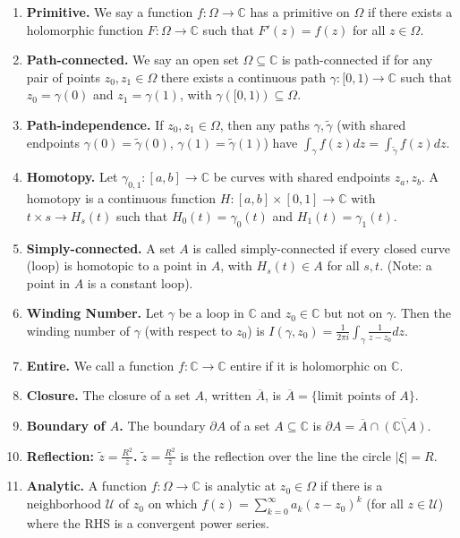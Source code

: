 \documentclass[11pt]{article}
\theoremstyle{definition}
\theoremstyle{named}
\begin{document}
\begin{enumerate}
    \item \textbf{Primitive. } We say a function $f: \Omega \to \mathbb{C}$ has a primitive on $\Omega$ if there exists a holomorphic function $F: \Omega \to \mathbb{C}$ such that $F'(z) = f(z)$ for all $z \in \Omega$. 
    \item \textbf{Path-connected. } We say an open set $\Omega \subseteq \mathbb{C}$ is path-connected if for any pair of points $z_0, z_1 \in \Omega$ there exists a continuous path $\gamma: [0,1) \to \mathbb{C}$ such that $z_0 = \gamma(0)$ and $z_1 = \gamma(1)$, with $\gamma\left([0,1)\right) \subseteq \Omega$. 
    \item \textbf{Path-independence. } If $z_0,z_1 \in \Omega$, then any paths $\gamma, \tilde{\gamma}$ (with shared endpoints $\gamma(0) = \tilde{\gamma}(0)$, $\gamma(1) = \tilde{\gamma}(1)$) have $\int_{\gamma} f(z) dz = \int_{\tilde{\gamma}} f(z) dz$. 
    \item \textbf{Homotopy. } Let $\gamma_{0,1}: [a,b] \to \mathbb{C}$ be curves with shared endpoints $z_a, z_b$. A homotopy is a continuous function $H: [a,b] \times [0,1] \to \mathbb{C}$ with $t \times s \to H_s(t)$ such that $H_0(t) = \gamma_0(t)$ and $H_1(t) = \gamma_1(t)$. 
    \item \textbf{Simply-connected. } A set $A$ is called simply-connected if every closed curve (loop) is homotopic to a point in $A$, with $H_s(t) \in A$ for all $s,t$. (Note: a point in $A$ is a constant loop). 
    \item \textbf{Winding Number. } Let $\gamma$ be a loop in $\mathbb{C}$ and $z_0 \in \mathbb{C}$ but not on $\gamma$. Then the winding number of $\gamma$ (with respect to $z_0$) is $I(\gamma,z_0) = \frac{1}{2\pi i}\int_{\gamma} \frac{1}{z-z_0} dz$. 
    \item \textbf{Entire. } We call a function $f: \mathbb{C} \to \mathbb{C}$ entire if it is holomorphic on $\mathbb{C}$. 
    \item \textbf{Closure. } The closure of a set $A$, written $\overline{A}$, is $\overline{A} = \{\textrm{limit points of $A$}\}$. 
    \item \textbf{Boundary of $A$. } The boundary $\partial A$ of a set $A \subseteq \mathbb{C}$ is $\partial A = \overline{A} \cap \overline{\left(\mathbb{C} \setminus A\right)}$. 
    \item \textbf{Reflection: $\tilde{z} = \frac{R^2}{\overline{z}}$. } $\tilde{z} = \frac{R^2}{\overline{z}}$ is the reflection over the line the circle $|\xi| = R$. 
    \item \textbf{Analytic. } A function $f: \Omega \to \mathbb{C}$ is analytic at $z_0 \in \Omega$ if there is a neighborhood $\mathcal{U}$ of $z_0$ on which $f(z) = \sum_{k=0}^{\infty} a_k(z-z_0)^k$ (for all $z \in \mathcal{U}$) where the RHS is a convergent power series. 

\end{enumerate}
\end{document}
